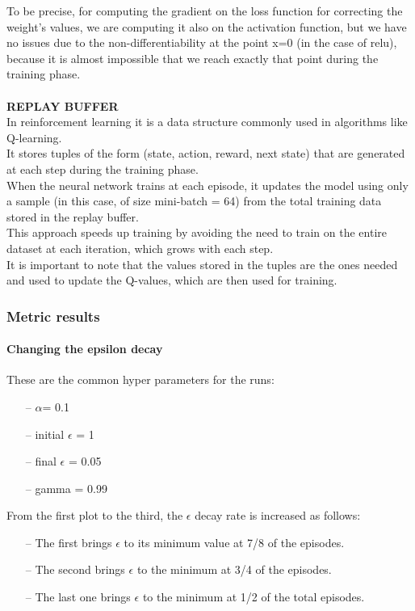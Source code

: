 \documentclass{article}
\begin{document}
To be precise, for computing the gradient on the loss function for correcting the weight's values, we are computing it also on the activation function, but we have no issues due to the non-differentiability at the point x=0 (in the case of relu), because it is almost impossible that we reach exactly that point during the training phase.
\\
\\
\textbf{REPLAY BUFFER}
\\
In reinforcement learning it is a data structure commonly used in algorithms like Q-learning.
\\
It stores tuples of the form (state, action, reward, next state) that are generated at each step during the training phase.
\\
When the neural network trains at each episode, it updates the model using only a sample (in this case, of size mini-batch = 64) from the total training data stored in the replay buffer. 
\\
This approach speeds up training by avoiding the need to train on the entire dataset at each iteration, which grows with each step.
\\
It is important to note that the values stored in the tuples are the ones needed and used to update the Q-values, which are then used for training.


\subsubsection{Metric results}


\paragraph{Changing the epsilon decay}


These are the common hyper parameters for the runs:
\begin{itemize}
\item[--] $\alpha$= 0.1
\item[--] initial $\epsilon$ = 1
\item[--] final $\epsilon$ = 0.05
\item[--] gamma = 0.99
\end{itemize}

From the first plot to the third, the $\epsilon$ decay rate is increased as follows:

\begin{itemize}
\item[--] The first brings $\epsilon$ to its minimum value at 7/8 of the episodes.
\item[--] The second brings $\epsilon$ to the minimum at 3/4 of the episodes.
\item[--] The last one brings $\epsilon$ to the minimum at 1/2 of the total episodes.
\end{itemize}
\end{document}
